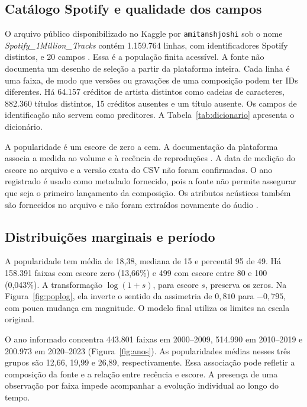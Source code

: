 \subsection{Catálogo Spotify e qualidade dos campos}
O arquivo público disponibilizado no Kaggle por \texttt{amitanshjoshi} sob o nome \textit{Spotify\_1Million\_Tracks} contém 1.159.764 linhas, com identificadores Spotify distintos, e 20 campos \cite{spotifydataset}. Essa é a população finita acessível. A fonte não documenta um desenho de seleção a partir da plataforma inteira. Cada linha é uma faixa, de modo que versões ou gravações de uma composição podem ter IDs diferentes. Há 64.157 créditos de artista distintos como cadeias de caracteres, 882.360 títulos distintos, 15 créditos ausentes e um título ausente. Os campos de identificação não servem como preditores. A Tabela~\ref{tab:dicionario} apresenta o dicionário.



A popularidade é um escore de zero a cem. A documentação da plataforma associa a medida ao volume e à recência de reproduções \cite{spotifydocs}. A data de medição do escore no arquivo e a versão exata do CSV não foram confirmadas. O ano registrado é usado como metadado fornecido, pois a fonte não permite assegurar que seja o primeiro lançamento da composição. Os atributos acústicos também são fornecidos no arquivo e não foram extraídos novamente do áudio \cite{spotifyaudio}.

\subsection{Distribuições marginais e período}
A popularidade tem média de 18,38, mediana de 15 e percentil 95 de 49. Há 158.391 faixas com escore zero (13,66\%) e 499 com escore entre 80 e 100 (0,043\%). A transformação $\log(1+s)$, para escore $s$, preserva os zeros. Na Figura~\ref{fig:poplog}, ela inverte o sentido da assimetria de $0,810$ para $-0,795$, com pouca mudança em magnitude. O modelo final utiliza os limites na escala original.


O ano informado concentra 443.801 faixas em 2000--2009, 514.990 em 2010--2019 e 200.973 em 2020--2023 (Figura~\ref{fig:anos}). As popularidades médias nesses três grupos são 12,66, 19,99 e 26,89, respectivamente. Essa associação pode refletir a composição da fonte e a relação entre recência e escore. A presença de uma observação por faixa impede acompanhar a evolução individual ao longo do tempo.

